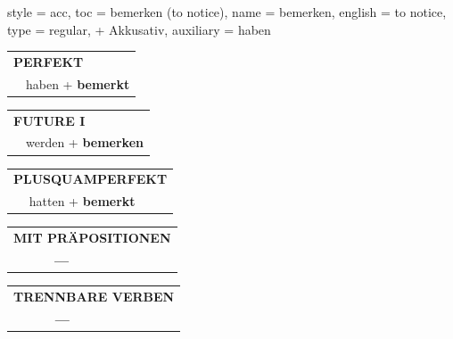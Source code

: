 \begin{verbentry}{
  style = {acc},
  toc = {bemerken (to notice)},
  name = {bemerken},
  english = {to notice},
  type = {regular, + Akkusativ},
  auxiliary = {haben}
}
\vspace{10pt}

\begin{tabular}{rl}
\multicolumn{2}{l}{\textbf{PERFEKT}}\\
& haben + \textbf{bemerkt}\\
\end{tabular}
\hfill
\begin{tabular}{rl}
\multicolumn{2}{l}{\textbf{FUTURE I}}\\
& werden + \textbf{bemerken}\\
\end{tabular}
\hfill
\begin{tabular}{rl}
\multicolumn{2}{l}{\textbf{PLUSQUAMPERFEKT}}\\
& hatten + \textbf{bemerkt}\\
\end{tabular}

\vspace{10pt}

\begin{tabular}{lll}
\multicolumn{3}{l}{\textbf{MIT PRÄPOSITIONEN}}\\
& \textbf{---} & \\
\end{tabular}
\hfill
\begin{tabular}{lll}
\multicolumn{3}{l}{\textbf{TRENNBARE VERBEN}}\\
& \textbf{---} & \\
\end{tabular}

\vspace{-5pt}
\end{verbentry}

